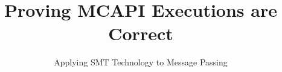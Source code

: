 \documentclass[preprint]{acm_proc_article-sp}
\begin{document}
%
%
\title{Proving MCAPI Executions are Correct}
\subtitle{Applying SMT Technology to Message Passing}

{}

\maketitle



%
%
\begin{abstract}


\end{abstract}
%





%





\end{document}
